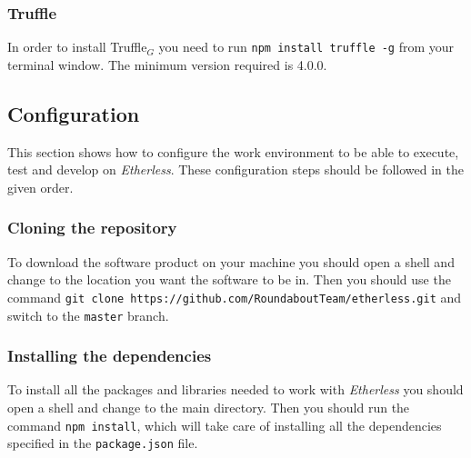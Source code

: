 \subsubsection{Truffle}
 In order to install Truffle$_{G}$ you need to run \texttt{npm install truffle -g} from your terminal window. The minimum version required is 4.0.0.
\subsection{Configuration}
This section shows how to configure the work environment to be able to execute, test and develop on \textit{Etherless}. These configuration steps should be followed in the given order.
\subsubsection{Cloning the repository}
To download the software product on your machine you should open a shell and change to the location you want the software to be in. Then you should use the command \texttt{git clone https://github.com/RoundaboutTeam/etherless.git} and switch to the \texttt{master} branch.
\subsubsection{Installing the dependencies}
To install all the packages and libraries needed to work with \textit{Etherless} you should open a shell and change to the main directory. Then you should run the command \texttt{npm install}, which will take care of installing all the dependencies specified in the \texttt{package.json} file.
